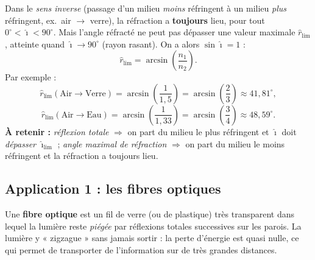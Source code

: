 \documentclass[11pt,a4paper]{article}
\newcommand{\angi}{\hat{\imath}}     %
\begin{document}
\begin{remarque}
Dans le \emph{sens inverse} (passage d'un milieu \emph{moins} réfringent à un milieu \emph{plus}
réfringent, ex.\ air $\to$ verre), la réfraction a \textbf{toujours} lieu, pour tout
$0^\circ < \angi < 90^\circ$. Mais l'angle réfracté ne peut pas dépasser une valeur maximale
$\hat{r}_{\text{lim}}$, atteinte quand $\angi \to 90^\circ$ (rayon rasant). On a alors $\sin\angi = 1$ :
\[ \hat{r}_{\text{lim}} = \arcsin\!\left(\frac{n_1}{n_2}\right). \]
Par exemple :
\[ \hat{r}_{\text{lim}}(\text{Air} \to \text{Verre}) = \arcsin\!\left(\frac{1}{1{,}5}\right)
   = \arcsin\!\left(\frac{2}{3}\right) \approx 41{,}81^\circ, \]
\[ \hat{r}_{\text{lim}}(\text{Air} \to \text{Eau}) = \arcsin\!\left(\frac{1}{1{,}33}\right)
   = \arcsin\!\left(\frac{3}{4}\right) \approx 48{,}59^\circ. \]
\textbf{À retenir :} \emph{réflexion totale} $\Rightarrow$ on part du milieu le plus réfringent et
$\angi$ doit \emph{dépasser} $\angi_{\text{lim}}$ ; \emph{angle maximal de réfraction} $\Rightarrow$
on part du milieu le moins réfringent et la réfraction a toujours lieu.
\end{remarque}

\subsection{Application 1 : les fibres optiques}

\begin{definition}
Une \textbf{fibre optique} est un fil de verre (ou de plastique) très transparent dans lequel la
lumière reste \emph{piégée} par réflexions totales successives sur les parois. La lumière y
« zigzague » sans jamais sortir : la perte d'énergie est quasi nulle, ce qui permet de transporter
de l'information sur de très grandes distances.
\end{definition}

\begin{center}
\end{center}
\end{document}
